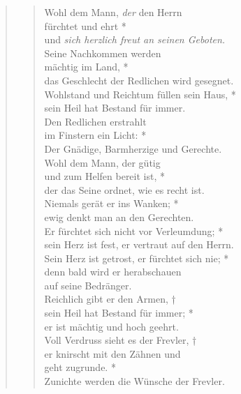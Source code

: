 \vspace{0.6cm}
\def\greinitialformat#1{{\fontsize{40}{40}\selectfont #1}}
\gresetfirstlineaboveinitial{\small \textcolor{red}{Ps 111(112)}}{}
\setaboveinitialseparation{0.72mm}


\medskip


\begin{quote}
\begin{verse}
Wohl dem Mann, {\it{der}} den Herrn\\
fürchtet und ehrt *\\
und {\it{sich herzlich freut an seinen Geboten.}}\\
\vin Seine Nachkommen werden\\ 
\vin mächtig im Land, *\\
\vin das Geschlecht der Redlichen wird gesegnet.\\
Wohlstand und Reichtum füllen sein Haus, *\\
sein Heil hat Bestand für immer.\\
\vin Den Redlichen erstrahlt\\
\vin im Finstern ein Licht: *\\
\vin Der Gnädige, Barmherzige und Gerechte.\\
Wohl dem Mann, der gütig\\
und zum Helfen bereit ist, *\\
der das Seine ordnet, wie es recht ist.\\
\vin Niemals gerät er ins Wanken; *\\
\vin ewig denkt man an den Gerechten.\\
Er fürchtet sich nicht vor Verleumdung; *\\
sein Herz ist fest, er vertraut auf den Herrn.\\
\vin Sein Herz ist getrost, er fürchtet sich nie; *\\
\vin denn bald wird er herabschauen\\
\vin auf seine Bedränger.\\
Reichlich gibt er den Armen, †\\
sein Heil hat Bestand für immer; *\\
er ist mächtig und hoch geehrt.\\
\vin Voll Verdruss sieht es der Frevler, †\\
\vin er knirscht mit den Zähnen und\\ 
\vin geht zugrunde. *\\
\vin Zunichte werden die Wünsche der Frevler.\\
\end{verse}

\end{quote}

